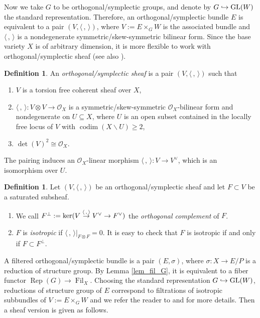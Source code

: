 \documentclass[JEP,XML,SOM,Unicode,published]{cedram}
\newcommand\hto{\mathrel{\lhook\joinrel\to}}
\newcommand\To[1]{\mathchoice{\xrightarrow{\textstyle\kern4pt#1\kern3pt}}{\stackrel{#1}{\to}}{}{}}
\DeclareMathOperator{\codim}{codim}
\DeclareMathOperator{\Filt}{Fil}
\DeclareMathOperator{\GL}{GL}
\DeclareMathOperator{\Rep}{Rep}
\newcommand{\sO}{{\mathcal O}}
\theoremstyle{plain}
\theoremstyle{definition}
\newtheorem{defn}[thm]{Definition}
\begin{document}
Now we take $G$ to be orthogonal/symplectic groups, and
denote by $G \hto \GL(W)$ the standard representation. Therefore, an orthogonal/symplectic bundle $E$ is equivalent to a pair $(V, \langle \,, \, \rangle)$, where $V:=E \times_G W$ is the associated bundle and $\langle \,, \, \rangle$ is a nondegenerate symmetric/skew-symmetric bilinear form. Since the base variety $X$ is of arbitrary dimension, it is more flexible to work with orthogonal/symplectic sheaf (see also \cite[\S 5]{GS03}).
\begin{defn}
An \emph{orthogonal/symplectic sheaf} is a pair $(V, \langle \,, \, \rangle)$ such that
\begin{enumerate}
\item $V$ is a torsion free coherent sheaf over $X$,

\item $\langle \,, \, \rangle:V\otimes V\to \sO_X$ is a symmetric/skew-symmetric $\sO_X$-bilinear form and nondegenerate on $U \subseteq X$, where $U$ is an open subset contained in the locally free locus of $V$ with $\codim(X \backslash U)\geq 2$,

\item $\det(V)^2 \cong \mathcal{O}_X$.
\end{enumerate}
\end{defn}
The pairing induces an $\sO_X$-linear morphism $\langle \,, \, \rangle: V\to V^{\vee}$, which is an isomorphism over $U$.
\begin{defn}
Let $(V,\langle \,, \, \rangle)$ be an orthogonal/symplectic sheaf and let $F\subset V$ be a saturated subsheaf.
\begin{enumerate}
\item We call $F^{\perp}:=\ker(V\To{\langle \,, \, \rangle} V^{\vee}\to F^{\vee})$ the \emph{orthogonal complement} of $F$.

\item $F$ is \emph{isotropic} if $\langle \,, \, \rangle|_{F\otimes F}=0$. It is easy to check that $F$ is isotropic if and only if $F\subset F^{\perp}$.
\end{enumerate}
\end{defn}

A filtered orthogonal/symplectic bundle is a pair $(E,\sigma)$, where $\sigma: X \to E/P$ is a reduction of structure group. By Lemma \ref{lem_fil_G}, it is equivalent to a fiber functor $\Rep(G) \to \Filt_X$. Choosing the standard representation $G \hto \GL(W)$, reductions of structure group of $E$ correspond to filtrations of isotropic subbundles of $V:=E \times_G W$ and we refer the reader to \cite[\S 6]{CS21} and \cite[\S 5]{Ya22} for more details. Then a sheaf version is given as follows.
\end{document}
